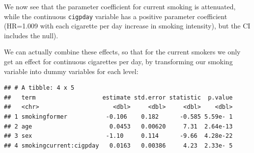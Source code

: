 \documentclass[
]{book}
\newenvironment{Shaded}{\begin{snugshade}}{\end{snugshade}}
\newcommand{\CommentTok}[1]{\textcolor[rgb]{0.56,0.35,0.01}{\textit{#1}}}
\newcommand{\DataTypeTok}[1]{\textcolor[rgb]{0.13,0.29,0.53}{#1}}
\newcommand{\DecValTok}[1]{\textcolor[rgb]{0.00,0.00,0.81}{#1}}
\newcommand{\KeywordTok}[1]{\textcolor[rgb]{0.13,0.29,0.53}{\textbf{#1}}}
\newcommand{\NormalTok}[1]{#1}
\newcommand{\OperatorTok}[1]{\textcolor[rgb]{0.81,0.36,0.00}{\textbf{#1}}}
\newcommand{\StringTok}[1]{\textcolor[rgb]{0.31,0.60,0.02}{#1}}
\begin{document}
We now see that the parameter coefficient for current smoking is attenuated, while the continuous \texttt{cigpday} variable has a positive parameter coefficient (HR=1.009 with each cigarette per day increase in smoking intensity), but the CI includes the null).

We can actually combine these effects, so that for the current smokers we only get an effect for continuous cigarettes per day, by transforming our smoking variable into dummy variables for each level:

\begin{Shaded}
\end{Shaded}

\begin{verbatim}
## # A tibble: 4 x 5
##   term                   estimate std.error statistic  p.value
##   <chr>                     <dbl>     <dbl>     <dbl>    <dbl>
## 1 smokingformer           -0.106    0.182      -0.585 5.59e- 1
## 2 age                      0.0453   0.00620     7.31  2.64e-13
## 3 sex                     -1.10     0.114      -9.66  4.28e-22
## 4 smokingcurrent:cigpday   0.0163   0.00386     4.23  2.33e- 5
\end{verbatim}
\end{document}
